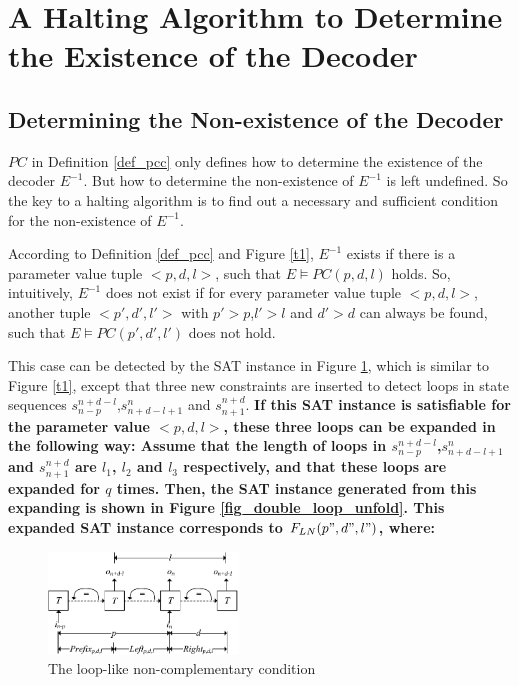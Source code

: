 \documentclass[journal]{IEEEtran}
\begin{document}
\section{A Halting Algorithm to Determine the Existence of the Decoder}\label{sec_exist}
\subsection{Determining the Non-existence of the Decoder}\label{subsec_deterNo}

$PC$ in Definition \ref{def_pcc} only defines how to determine the existence of the decoder $E^{-1}$.
But how to determine the non-existence of $E^{-1}$ is left undefined.
So the key to a halting algorithm is to find out a necessary and sufficient condition for the non-existence of $E^{-1}$.

According to Definition \ref{def_pcc} and Figure \ref{t1},
$E^{-1}$ exists if there is a parameter value tuple $<p,d,l>$,
such that $E\vDash PC(p,d,l)$ holds.
So,
intuitively,
$E^{-1}$ does not exist if for every parameter value tuple $<p,d,l>$,
another tuple $<p',d',l'>$ with $p'>p$,$l'>l$ and $d'>d$ can always be found,
such that $E\vDash PC(p',d',l')$ does not hold.

This case can be detected by the SAT instance in Figure \ref{fig_double_loop},
which is similar to Figure \ref{t1},
except that three new constraints are inserted to detect loops in state sequences $s_{n-p}^{n+d-l}$,$s_{n+d-l+1}^n$ and $s_{n+1}^{n+d}$.
\textbf{If this SAT instance is satisfiable for the parameter value $<p,d,l>$,
these three loops can be expanded in the following way:
Assume that the length of loops in $s_{n-p}^{n+d-l}$,$s_{n+d-l+1}^n$ and $s_{n+1}^{n+d}$ are $l_1$, $l_2$ and $l_3$ respectively,
and that these loops are expanded for $q$ times.
Then,
the SAT instance generated from this expanding is shown in Figure \ref{fig_double_loop_unfold}.
This expanded SAT instance corresponds to $F_{LN}(p",d",l")$,
where:}

\begin{figure}[t]
\begin{center}
\includegraphics[width=0.45\textwidth]{doubleloop}
\end{center}
\caption{The loop-like non-complementary condition}
  \label{fig_double_loop}
\end{figure}
\end{document}
